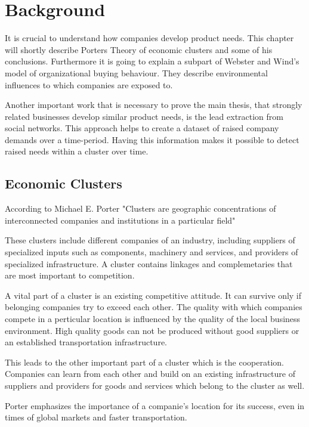 \section{Background}

It is crucial to understand how companies develop product needs. This chapter will shortly describe Porters Theory of
economic clusters and some of his conclusions. Furthermore it is going to explain a subpart of
Webster and Wind's model of organizational buying behaviour. They describe environmental influences to which
companies are exposed to.

Another important work that is necessary to prove the main thesis, that strongly related businesses develop similar product needs,
is the lead extraction from social networks.
This approach helps to create a dataset of raised company demands over a time-period. Having this information makes
it possible to detect raised needs within a cluster over time.


\subsection{Economic Clusters}

According to Michael E. Porter \cite{CompanyClusters} "Clusters are geographic concentrations of
interconnected companies and institutions in a particular field"

These clusters include different companies of an industry, including suppliers of specialized inputs such as components,
machinery and services, and providers of specialized infrastructure. A cluster contains linkages and complemetaries
that are most important to competition.

A vital part of a cluster is an existing competitive attitude. It can survive only if belonging companies try to
exceed each other. The quality with which companies compete in a perticular location is influenced by the quality
of the local business environment. High quality goods can not be produced without good suppliers or an established
transportation infrastructure.

This leads to the other important part of a cluster which is the cooperation. Companies can learn from each other
and build on an existing infrastructure  of suppliers and providers for goods and services which belong to the
cluster as well.

Porter emphasizes the importance of a companie's location for its success, even in times of global markets and faster
transportation.

